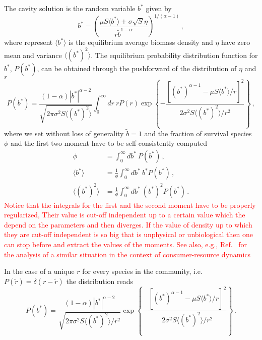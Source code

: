 \documentclass[10pt]{article}
\begin{document}
The cavity solution is the random variable $b^*$ given by
\begin{equation}
    b^* = \left(\frac{\mu S \langle b^* \rangle + \sigma \sqrt{S} \eta}
    {r \tilde{b}^{1-\alpha}}\right)^{1/(\alpha-1)} \, ,
\end{equation}
where represent $\langle b^*\rangle$ is the equilibrium average biomass density
and $\eta$ have zero mean and variance $\langle (b^*)^2\rangle$.
The equilibrium probability distribution function for $b^*$, $P(b^*)$,
can be obtained through the pushforward of the distribution of $\eta$ and $r$
\begin{equation}
    P(b^*)=\frac{(1-\alpha)|b^*|^{\alpha-2}}{\sqrt{2\pi \sigma^2 S\langle (b^*)^2 \rangle}}
    \int_0^{\infty}dr \ r P(r)
    \exp{\left\{-\frac{\left[(b^*)^{\alpha-1}-\mu S\langle b^*\rangle/r\right]^2}{2\sigma^2S\langle (b^*)^2 \rangle/r^2}\right\}} \, ,
\end{equation}
where we set without loss of generality $\tilde{b}=1$ and the fraction
of survival species $\phi$ and the first two moment
have to be self-consistently computed
\begin{align}
    \phi&= \int_0^{\infty}db^* \ P(b^*)\, , \\
    \langle b^*\rangle&=\frac{1}{\phi}\int_0^{\infty}db^* \ b^*P(b^*) \, , \\
    \langle (b^*)^2\rangle&=\frac{1}{\phi}\int_0^{\infty}db^* \ (b^*)^2 P(b^*) \, .
\end{align}
\textcolor{red}{Notice that the integrals for the first and the second moment have to be properly regularized,
Their value is cut-off independent up to a certain value which the depend on the parameters and then
diverges. If the value of density up to which they are cut-off independent is so big that is unphysical
or unbiological then one can stop before and extract the values of the moments.
See also, e.g., Ref.~\cite{Cui2020} for the analysis of a similar situation in the
context of consumer-resource dynamics}

In the case of a unique $r$ for every species in the community, i.e. $P(\tilde{r})=\delta(r-\tilde{r})$
the distribution reads
\begin{equation}
    P(b^*)=\frac{(1-\alpha)|b^*|^{\alpha-2}}{\sqrt{2\pi \sigma^2 S\langle (b^*)^2 \rangle/r^2}}
    \exp{\left\{-\frac{\left[(b^*)^{\alpha-1}-\mu S\langle b^*\rangle/r\right]^2}{2\sigma^2S\langle (b^*)^2 \rangle/r^2}\right\}} \, .
    \label{eq: species dist unique r}
\end{equation}
\end{document}
